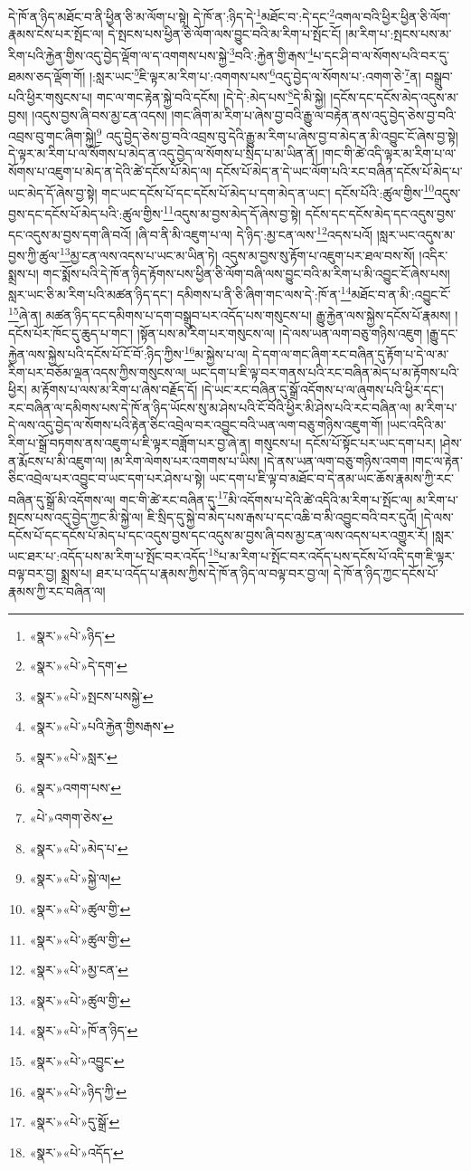 དེ་ཁོ་ན་ཉིད་མཐོང་བ་ནི་ཕྱིན་ཅི་མ་ལོག་པ་སྟེ། དེ་ཁོ་ན་:ཉིད་དེ་\footnote{«སྣར་»«པེ་»ཉིད་}མཐོང་བ་:དེ་དང་\footnote{«སྣར་»«པེ་»དེ་དག་}འགལ་བའི་ཕྱིར་ཕྱིན་ཅི་ལོག་རྣམས་ངེས་པར་སྤོང་ལ། དེ་སྤངས་པས་ཕྱིན་ཅི་ལོག་ལས་བྱུང་བའི་མ་རིག་པ་སྤོང་ངོ། །མ་རིག་པ་:སྤངས་པས་མ་རིག་པའི་རྐྱེན་གྱིས་འདུ་བྱེད་ལྡོག་ལ་ད་འགགས་པས་སྐྱེ་\footnote{«སྣར་»«པེ་»སྤངས་པསསྐྱེ་}བའི་:རྐྱེན་གྱི་རྒས་\footnote{«སྣར་»«པེ་»པའི་རྐྱེན་གྱིསརྒས་}པ་དང་ཤི་བ་ལ་སོགས་པའི་བར་དུ་ཐམས་ཅད་ལྡོག་གོ། །:སླར་ཡང་\footnote{«སྣར་»«པེ་»སླར་}ཇི་ལྟར་མ་རིག་པ་:འགགས་པས་\footnote{«སྣར་»འགག་པས་}འདུ་བྱེད་ལ་སོགས་པ་:འགག་ཅེ་\footnote{«པེ་»འགག་ཅེས་}ན། བསྒྲུབ་པའི་ཕྱིར་གསུངས་པ། གང་ལ་གང་རྟེན་སྐྱེ་བའི་དངོས། །དེ་དེ་:མེད་པས་\footnote{«སྣར་»«པེ་»མེད་པ་}དེ་མི་སྐྱེ། །དངོས་དང་དངོས་མེད་འདུས་མ་བྱས། །འདུས་བྱས་ཞི་བས་མྱ་ངན་འདས། །གང་ཞིག་མ་རིག་པ་ཞེས་བྱ་བའི་རྒྱུ་ལ་བརྟེན་ནས་འདུ་བྱེད་ཅེས་བྱ་བའི་འབྲས་བུ་གང་ཞིག་སྐྱེ།\footnote{«སྣར་»«པེ་»སྐྱེ་ལ།} འདུ་བྱེད་ཅེས་བྱ་བའི་འབྲས་བུ་དེའི་རྒྱུ་མ་རིག་པ་ཞེས་བྱ་བ་མེད་ན་མི་འབྱུང་ངོ་ཞེས་བྱ་སྟེ། དེ་ལྟར་མ་རིག་པ་ལ་སོགས་པ་མེད་ན་འདུ་བྱེད་ལ་སོགས་པ་སྲིད་པ་མ་ཡིན་ནོ། །གང་གི་ཚེ་འདི་ལྟར་མ་རིག་པ་ལ་སོགས་པ་འཇུག་པ་མེད་ན་དེའི་ཚེ་དངོས་པོ་མེད་ལ། དངོས་པོ་མེད་ན་དེ་ཡང་ལོག་པའི་རང་བཞིན་དངོས་པོ་མེད་པ་ཡང་མེད་དོ་ཞེས་བྱ་སྟེ། གང་ཡང་དངོས་པོ་དང་དངོས་པོ་མེད་པ་དག་མེད་ན་ཡང་། དངོས་པོའི་:ཚུལ་གྱིས་\footnote{«སྣར་»«པེ་»ཚུལ་གྱི་}འདུས་བྱས་དང་དངོས་པོ་མེད་པའི་:ཚུལ་གྱིས་\footnote{«སྣར་»«པེ་»ཚུལ་གྱི་}འདུས་མ་བྱས་མེད་དོ་ཞེས་བྱ་སྟེ། དངོས་དང་དངོས་མེད་དང་འདུས་བྱས་དང་འདུས་མ་བྱས་དག་ཞི་བའོ། །ཞི་བ་ནི་མི་འཇུག་པ་ལ། དེ་ཉིད་:མྱ་ངན་ལས་\footnote{«སྣར་»«པེ་»མྱ་ངན་}འདས་པའོ། །སླར་ཡང་འདུས་མ་བྱས་ཀྱི་ཚུལ་\footnote{«སྣར་»«པེ་»ཚུལ་གྱི་}མྱ་ངན་ལས་འདས་པ་ཡང་མ་ཡིན་ཏེ། འདུས་མ་བྱས་སུ་རྟོག་པ་འཇུག་པར་ཐལ་བས་སོ། །འདིར་སྨྲས་པ། གང་སྨོས་པའི་དེ་ཁོ་ན་ཉིད་རྟོགས་པས་ཕྱིན་ཅི་ལོག་བཞི་ལས་བྱུང་བའི་མ་རིག་པ་མི་འབྱུང་ངོ་ཞེས་པས། སླར་ཡང་ཅི་མ་རིག་པའི་མཚན་ཉིད་དང་། དམིགས་པ་ནི་ཅི་ཞིག་གང་ལས་དེ་:ཁོ་ན་\footnote{«སྣར་»«པེ་»ཁོ་ན་ཉིད་}མཐོང་བ་ན་མི་:འབྱུང་ངོ་\footnote{«སྣར་»«པེ་»འབྱུང་}ཞེ་ན། མཚན་ཉིད་དང་དམིགས་པ་དག་བསྒྲུབ་པར་འདོད་པས་གསུངས་པ། རྒྱུ་རྐྱེན་ལས་སྐྱེས་དངོས་པོ་རྣམས། །དངོས་པོར་ཁོང་དུ་ཆུད་པ་གང་། །སྟོན་པས་མ་རིག་པར་གསུངས་ལ། །དེ་ལས་ཡན་ལག་བཅུ་གཉིས་འཇུག །རྒྱུ་དང་རྐྱེན་ལས་སྐྱེས་པའི་དངོས་པོ་ངོ་བོ་:ཉིད་ཀྱིས་\footnote{«སྣར་»«པེ་»ཉིད་ཀྱི་}མ་སྐྱེས་པ་ལ། དེ་དག་ལ་གང་ཞིག་རང་བཞིན་དུ་རྟོག་པ་དེ་ལ་མ་རིག་པར་བཅོམ་ལྡན་འདས་ཀྱིས་གསུངས་ལ། ཡང་དག་པ་ཇི་ལྟ་བར་གནས་པའི་རང་བཞིན་མེད་པ་མ་རྟོགས་པའི་ཕྱིར། མ་རྟོགས་པ་ལས་མ་རིག་པ་ཞེས་བརྗོད་དོ། །དེ་ཡང་རང་བཞིན་དུ་སྒྲོ་འདོགས་པ་ལ་ཞུགས་པའི་ཕྱིར་དང་། རང་བཞིན་ལ་དམིགས་པས་དེ་ཁོ་ན་ཉིད་ཡོངས་སུ་མ་ཤེས་པའི་ངོ་བོའི་ཕྱིར་མི་ཤེས་པའི་རང་བཞིན་ལ། མ་རིག་པ་དེ་ལས་འདུ་བྱེད་ལ་སོགས་པའི་རྟེན་ཅིང་འབྲེལ་བར་འབྱུང་བའི་ཡན་ལག་བཅུ་གཉིས་འཇུག་གོ། །ཡང་འདིའི་མ་རིག་པ་སྒྲོ་བཏགས་ནས་འཇུག་པ་ཇི་ལྟར་བཟློག་པར་བྱ་ཞེ་ན། གསུངས་པ། དངོས་པོ་སྟོང་པར་ཡང་དག་པར། །ཤེས་ན་རྨོངས་པ་མི་འཇུག་ལ། །མ་རིག་ལེགས་པར་འགགས་པ་ཡིས། །དེ་ནས་ཡན་ལག་བཅུ་གཉིས་འགག །གང་ལ་རྟེན་ཅིང་འབྲེལ་པར་འབྱུང་བ་ཡང་དག་པར་ཤེས་པ་སྟེ། ཡང་དག་པ་ཇི་ལྟ་བ་མཐོང་བ་དེ་ནམ་ཡང་ཆོས་རྣམས་ཀྱི་རང་བཞིན་དུ་སྒྲོ་མི་འདོགས་ལ། གང་གི་ཚེ་རང་བཞིན་དུ་\footnote{«སྣར་»«པེ་»དུ་སྒྲོ་}མི་འདོགས་པ་དེའི་ཚེ་འདིའི་མ་རིག་པ་སྤོང་ལ། མ་རིག་པ་སྤངས་པས་འདུ་བྱེད་ཀྱང་མི་སྐྱེ་ལ། ཇི་སྲིད་དུ་སྐྱེ་བ་མེད་པས་རྒས་པ་དང་འཆི་བ་མི་འབྱུང་བའི་བར་དུའོ། །དེ་ལས་དངོས་པོ་དང་དངོས་པོ་མེད་པ་དང་འདུས་བྱས་དང་འདུས་མ་བྱས་ཞི་བས་མྱ་ངན་ལས་འདས་པར་འགྱུར་རོ། །སླར་ཡང་ཐར་པ་:འདོད་པས་མ་རིག་པ་སྤོང་བར་འདོད་\footnote{«སྣར་»«པེ་»འདོད་}པ་མ་རིག་པ་སྤོང་བར་འདོད་པས་དངོས་པོ་འདི་དག་ཇི་ལྟར་བལྟ་བར་བྱ། སྨྲས་པ། ཐར་པ་འདོད་པ་རྣམས་ཀྱིས་དེ་ཁོ་ན་ཉིད་ལ་བལྟ་བར་བྱ་ལ། དེ་ཁོ་ན་ཉིད་ཀྱང་དངོས་པོ་རྣམས་ཀྱི་རང་བཞིན་ལ། 